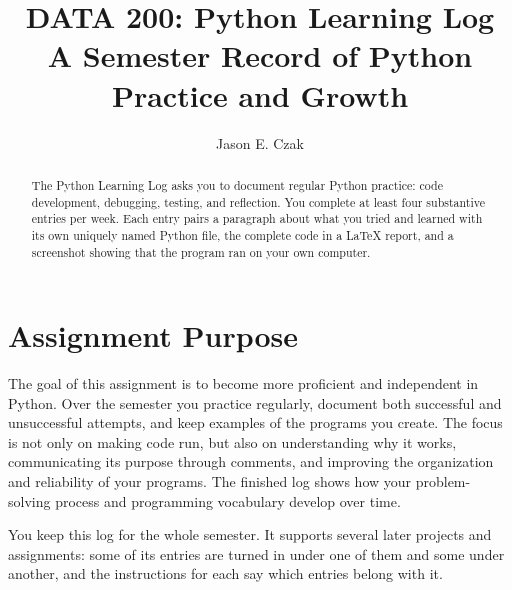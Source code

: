 \documentclass[11pt]{article}
\title{DATA 200: Python Learning Log\\\large A Semester Record of Python Practice and Growth}
\author{Jason E. Czak}
\date{}
\begin{document}
\maketitle

\begin{abstract}
The Python Learning Log asks you to document regular Python practice: code development, debugging, testing, and reflection. You complete at least four substantive entries per week. Each entry pairs a paragraph about what you tried and learned with its own uniquely named Python file, the complete code in a \LaTeX{} report, and a screenshot showing that the program ran on your own computer.
\end{abstract}

\setcounter{tocdepth}{1}
\tableofcontents
\newpage

\section{Assignment Purpose}
The goal of this assignment is to become more proficient and independent in Python. Over the semester you practice regularly, document both successful and unsuccessful attempts, and keep examples of the programs you create. The focus is not only on making code run, but also on understanding why it works, communicating its purpose through comments, and improving the organization and reliability of your programs. The finished log shows how your problem-solving process and programming vocabulary develop over time.

You keep this log for the whole semester. It supports several later projects and assignments: some of its entries are turned in under one of them and some under another, and the instructions for each say which entries belong with it.
\end{document}
